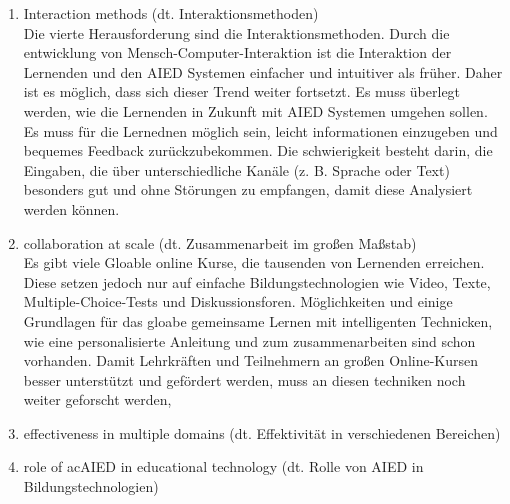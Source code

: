 \begin{enumerate}
    \item Interaction methods (dt. Interaktionsmethoden) \\
    Die vierte Herausforderung sind die Interaktionsmethoden. Durch die entwicklung von Mensch-Computer-Interaktion ist die Interaktion der Lernenden und den AIED Systemen einfacher und intuitiver als früher.
    Daher ist es möglich, dass sich dieser Trend weiter fortsetzt. Es muss überlegt werden, wie die Lernenden in Zukunft mit AIED Systemen umgehen sollen.
    Es muss für die Lernednen möglich sein, leicht informationen einzugeben und bequemes Feedback zurückzubekommen. Die schwierigkeit besteht darin, die Eingaben, die über unterschiedliche Kanäle (z. B. Sprache oder Text) besonders gut und ohne Störungen zu empfangen, damit diese Analysiert werden können.


    \item collaboration at scale (dt. Zusammenarbeit im großen Maßstab) \\
    Es gibt viele Gloable online Kurse, die tausenden von Lernenden erreichen. Diese setzen jedoch nur auf einfache Bildungstechnologien wie Video, Texte, Multiple-Choice-Tests und Diskussionsforen.
    Möglichkeiten und einige Grundlagen für das gloabe gemeinsame Lernen mit intelligenten Technicken, wie eine personalisierte Anleitung und zum zusammenarbeiten sind schon vorhanden. 
    Damit Lehrkräften und Teilnehmern an großen Online-Kursen besser unterstützt und gefördert werden, muss an diesen techniken noch weiter geforscht werden,
    
    \item effectiveness in multiple domains (dt. Effektivität in verschiedenen Bereichen) \\
    
    \item role of ac{AIED} in educational technology (dt. Rolle von \ac{AIED} in Bildungstechnologien) \\
\end{enumerate} 


\begin{comment}
Die Gesellschaft für Informatiker hat Herausforderungen für den Bereich Informatik definiert. Diese gelten selbstverständlich auch für \ac{AIED} Systeme.
Bei den Herausforderungen handelt es sich um die Bewahrung und Archivierung des digitalen Kulturerbes, ermöglichung eines sicheren, privaten, freien und vertrauensvollen Nutzung des Internets,
Bewältigung von Risikin in Globalen IT Infrastrukturen, Entwicklung von Interaktionsmöglichkeiten, die es allen Menschen ermöglicht von IT Systemen zu profitieren, sowie die Gewährleitungs das IT Systeme dauerhaft verfügbar sind.
weitere 
\end{comment}
    
